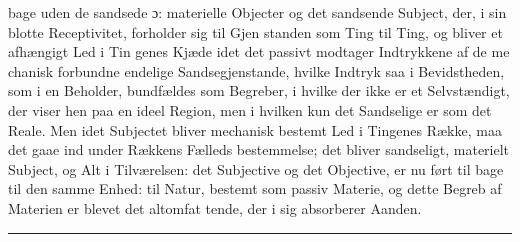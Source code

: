 \documentclass[12pt,a4paper]{book}
\newcommand{\divrule}{\begin{center}\rule{2cm}{0.4pt}\end{center}}
\begin{document}
bage uden de sandsede ɔ: materielle Objecter og det sandsende
Subject, der, i sin blotte Receptivitet, forholder sig til Gjen\-%
standen som Ting til Ting, og bliver et afhængigt Led i Tin\-%
genes Kjæde idet det passivt modtager Indtrykkene af de me\-%
chanisk forbundne endelige Sandsegjenstande, hvilke Indtryk saa
i Bevidstheden, som i en Beholder, bundfældes som Begreber,
i hvilke der ikke er et Selvstændigt, der viser hen paa en
ideel Region, men i hvilken kun det Sandselige er som det
Reale. Men idet Subjectet bliver mechanisk bestemt Led i
Tingenes Række, maa det gaae ind under Rækkens Fælleds\-%
bestemmelse; det bliver sandseligt, materielt Subject, og Alt
i Tilværelsen: det Subjective og det Objective, er nu ført til\-%
bage til den samme Enhed: til Natur, bestemt som passiv
Materie, og dette Begreb af Materien er blevet det altomfat\-%
tende, der i sig absorberer Aanden.

\divrule
\end{document}
